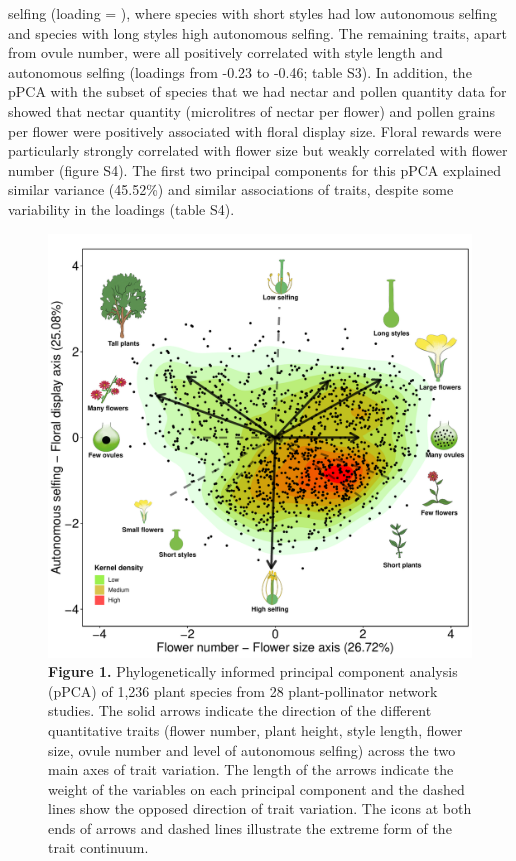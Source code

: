\documentclass[
  12pt,
  a4paper,
]{article}
\begin{document}
selfing (loading = \textbar), where species with short styles had low autonomous selfing and species with long styles high autonomous selfing. The remaining traits, apart from ovule number, were all positively correlated with style length and autonomous selfing (loadings from -0.23 to -0.46; table S3). In addition, the pPCA with the subset of species that we had nectar and pollen quantity data for showed that nectar quantity (microlitres of nectar per flower) and pollen grains per flower were positively associated with floral display size. Floral rewards were particularly strongly correlated with flower size but weakly correlated with flower number (figure S4). The first two principal components for this pPCA explained similar variance (45.52\%) and similar associations of traits, despite some variability in the loadings (table S4).

\begin{figure}[H]

{\centering \includegraphics[width=0.85\linewidth]{output/figures/unnamed-chunk-2-1} 

}

\caption{\textbf{Figure 1.} Phylogenetically informed principal component analysis (pPCA) of 1,236 plant species from 28 plant-pollinator network studies. The solid arrows indicate the direction of the different quantitative traits (flower number, plant height, style length, flower size, ovule number and level of autonomous selfing) across the two main axes of trait variation. The length of the arrows indicate the weight of the variables on each principal component and the dashed lines show the opposed direction of trait variation. The icons at both ends of arrows and dashed lines illustrate the extreme form of the trait continuum.}\label{fig:unnamed-chunk-2}
\end{figure}
\end{document}
